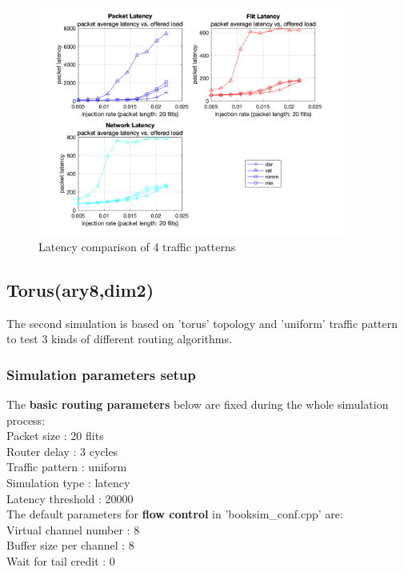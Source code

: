 \begin{figure}[H]
    \centering
    \includegraphics[width=0.9\textwidth]{Images/chap2/mesh_uniform/mesh_comparison.png}
    \caption{Latency comparison of 4 traffic patterns}
    \label{fig:com_mesh_uniform}
\end{figure}



\subsection{Torus(ary8,dim2)}

The second simulation is based on 'torus' topology and 'uniform' traffic pattern to test 3 kinds of different routing algorithms.
\subsubsection{Simulation parameters setup}
The \textbf{basic routing parameters} below are fixed during the whole simulation process:\\
Packet size : 20 flits\\
Router delay : 3 cycles\\
Traffic pattern : uniform\\
Simulation type : latency\\
Latency threshold : 20000\\
The default parameters for \textbf{flow control} in 'booksim\_conf.cpp' are: \\
Virtual channel number : 8\\
Buffer size per channel : 8\\
Wait for tail credit : 0\\

